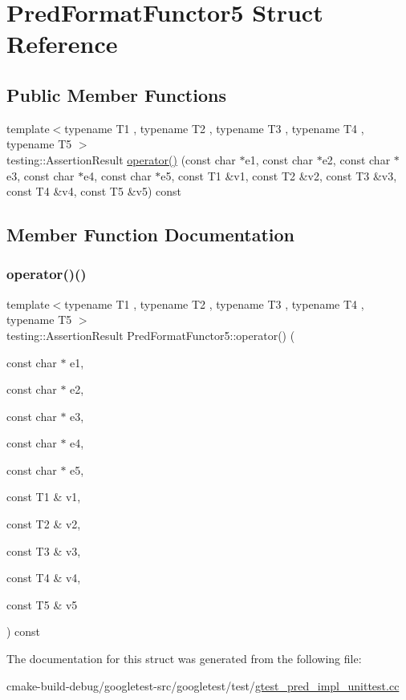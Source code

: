 \hypertarget{structPredFormatFunctor5}{}\section{Pred\+Format\+Functor5 Struct Reference}
\label{structPredFormatFunctor5}
\subsection*{Public Member Functions}
\begin{DoxyCompactItemize}
\item 
{\footnotesize template$<$typename T1 , typename T2 , typename T3 , typename T4 , typename T5 $>$ }\\testing\+::\+Assertion\+Result \mbox{\hyperlink{structPredFormatFunctor5_a0fe9e8e9ae614ea577cf1b34e9cfde58}{operator()}} (const char $\ast$e1, const char $\ast$e2, const char $\ast$e3, const char $\ast$e4, const char $\ast$e5, const T1 \&v1, const T2 \&v2, const T3 \&v3, const T4 \&v4, const T5 \&v5) const
\end{DoxyCompactItemize}


\subsection{Member Function Documentation}
\mbox{\label{structPredFormatFunctor5_a0fe9e8e9ae614ea577cf1b34e9cfde58}} 
\subsubsection{\texorpdfstring{operator()()}{operator()()}}
{\footnotesize\ttfamily template$<$typename T1 , typename T2 , typename T3 , typename T4 , typename T5 $>$ \\
testing\+::\+Assertion\+Result Pred\+Format\+Functor5\+::operator() (\begin{DoxyParamCaption}\item[{const char $\ast$}]{e1,  }\item[{const char $\ast$}]{e2,  }\item[{const char $\ast$}]{e3,  }\item[{const char $\ast$}]{e4,  }\item[{const char $\ast$}]{e5,  }\item[{const T1 \&}]{v1,  }\item[{const T2 \&}]{v2,  }\item[{const T3 \&}]{v3,  }\item[{const T4 \&}]{v4,  }\item[{const T5 \&}]{v5 }\end{DoxyParamCaption}) const\hspace{0.3cm}{\ttfamily [inline]}}



The documentation for this struct was generated from the following file\+:\begin{DoxyCompactItemize}
\item 
cmake-\/build-\/debug/googletest-\/src/googletest/test/\mbox{\hyperlink{gtest__pred__impl__unittest_8cc}{gtest\+\_\+pred\+\_\+impl\+\_\+unittest.\+cc}}\end{DoxyCompactItemize}

